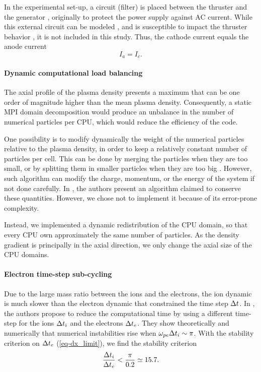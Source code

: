 In the experimental set-up, a circuit (filter) is placed between the thruster and the generator \citep{barral2008}, originally to protect the power supply against AC current.
While this external circuit can be modeled \citep{verboncoeur1993}, and is susceptible to impact the thruster behavior \citep{barral2008,wei2017}, it is not included in this study.
Thus, the cathode current equals the anode current \[ I_a = I_c. \]

\paragraph{Dynamic computational load balancing\\}
The axial profile of the plasma density presents a maximum that can be one order of magnitude higher than the mean plasma density.
Consequently, a static MPI domain decomposition would produce an unbalance in the number of numerical particles per CPU, which would reduce the efficiency of the code.

One possibility is to modify dynamically the weight of the numerical particles relative to the plasma density, in order to keep a relatively constant number of particles per cell.
This can be done by merging the particles when they are too small, or by splitting them in smaller particles when they are too big \citep{shon2001,teunissen2014}.
However, such algorithm can modify the charge, momentum, or the energy of the system if not done carefully.
In \citet{vranic2015}, the authors present an algorithm claimed to conserve these quantities.
However, we chose not to implement it because of its error-prone complexity.

Instead, we implemented a dynamic redistribution of the CPU domain, so that every CPU own approximately the same number of particles.
As the density gradient is principally in the axial direction, we only change the axial size of the CPU domains.

\paragraph{Electron time-step sub-cycling\\}
Due to the large mass ratio between the  ions and the electrons, the ion dynamic is much slower than the electron dynamic that constrained the time step  $\Delta t$.
In \citet{adam1982}, the authors propose to reduce the computational time by using a different time-step  for the ions $\Delta t_i$ and the electrons $\Delta t_e$.
They show theoretically and numerically that numerical instabilities rise when $\omega_{pe} \Delta t_i  \sim \pi$.
With the stability criterion on $\Delta t_e$ (\cref{eq-dx_limit}), we find the stability criterion 
\begin{equation} \label{eq-subcycling_criterion}
  \frac{\Delta t_i}{\Delta t_e} < \frac{\pi}{0.2} \simeq 15.7.
\end{equation}

